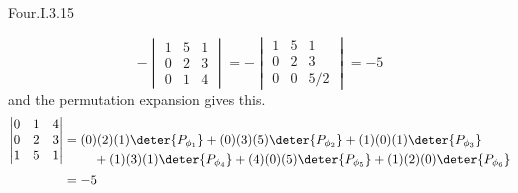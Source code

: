 \begin{ans}{Four.I.3.15}
\begin{exparts}
\begin{equation*}
            -\begin{vmatrix}
              1  &5  &1  \\
              0  &2  &3  \\
              0  &1  &4
            \end{vmatrix}
            =
            -\begin{vmatrix}
              1  &5  &1  \\
              0  &2  &3  \\
              0  &0  &5/2
            \end{vmatrix}
            =-5
          \end{equation*}
          and the permutation expansion gives this.
          \begin{align*}
            \begin{vmatrix}
              0  &1  &4  \\
              0  &2  &3  \\
              1  &5  &1
            \end{vmatrix}
            &=
            \begin{aligned}[t]
            &(0)(2)(1)\deter{P_{\phi_1}}
            +(0)(3)(5)\deter{P_{\phi_2}}
            +(1)(0)(1)\deter{P_{\phi_3}}  \\
            &\hbox{}\quad\hbox{}
            +(1)(3)(1)\deter{P_{\phi_4}}
            +(4)(0)(5)\deter{P_{\phi_5}}
            +(1)(2)(0)\deter{P_{\phi_6}}
            \end{aligned}                         \\
            &=-5
          \end{align*}
      \end{exparts}
    
\end{ans}
